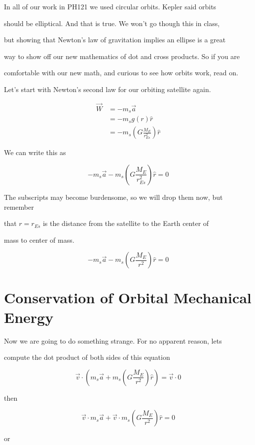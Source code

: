 In all of our work in PH121 we used circular orbits. Kepler said orbits

should be elliptical. And that is true. We won't go though this in class,

but showing that Newton's law of gravitation implies an ellipse is a great

way to show off our new mathematics of dot and cross products. So if you are

comfortable with our new math, and curious to see how orbits work, read on.


Let's start with Newton's second law for our orbiting satellite again.

\begin{align*}
\overrightarrow{W}&=-m_{s}\overrightarrow{a}\\
&=-m_{s}g\left( r\right) \hat{r}\\
&=-m_{s}\left( G\frac{M_{E}}{r_{Es}^{2}}\right) \hat{r}
\end{align*}




We can write this as 

$$
-m_{s}\overrightarrow{a}-m_{s}\left( G\frac{M_{E}}{r_{Es}^{2}}\right) \hat{r}=0
$$


The subscripts may become burdensome, so we will drop them now, but remember

that $r=r_{Es}$ is the distance from the satellite to the Earth center of

mass to center of mass. 

$$-m_{s}\overrightarrow{a}-m_{s}\left( G\frac{M_{E}}{r^{2}}\right) \hat{r}=0$$


\section{Conservation of Orbital Mechanical Energy}


Now we are going to do something strange. For no apparent reason, lets

compute the dot product of both sides of this equation 

$$\overrightarrow{v}\cdot \left( m_{s}\overrightarrow{a}+m_{s}\left( G\frac{M_{E}}{r^{2}}\right) \hat{r}\right) =\overrightarrow{v}\cdot 0 $$

then 

$$\overrightarrow{v}\cdot m_{s}\overrightarrow{a}+\overrightarrow{v}\cdot m_{s}\left( G\frac{M_{E}}{r^{2}}\right) \hat{r}=0 $$

or

